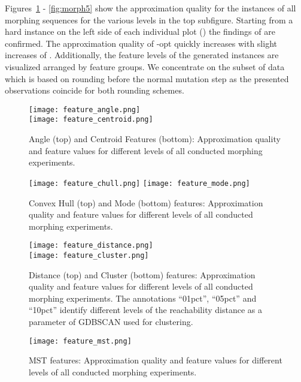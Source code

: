 \documentclass{article}
\begin{document}
Figures~\ref{fig:morph1} - \ref{fig:morph5} show the approximation
quality for the instances of all morphing sequences for the various
 levels in the top subfigure. Starting from a hard instance on
the left side of each individual plot () the findings of
\cite{EnglertRV07} are confirmed. The approximation quality of -opt
quickly increases with slight increases of . Additionally, the
feature levels of the generated instances are visualized arranged by
feature groups. We concentrate on the subset of data which is based on
rounding before the normal mutation step as the presented observations
coincide for both rounding schemes.

\begin{figure}
  \centering
  \texttt{[image: feature\_angle.png]} \\\vspace*{0.3cm}
  \texttt{[image: feature\_centroid.png]}
  \caption{Angle (top) and Centroid Features (bottom): Approximation
    quality and feature values for different  levels of all
    conducted morphing experiments.}
  \label{fig:morph1}
\end{figure}

\begin{figure}
  \centering
  \texttt{[image: feature\_chull.png]}\vspace*{0.3cm}
  \texttt{[image: feature\_mode.png]}
  \caption{Convex Hull (top) and Mode (bottom) features: Approximation quality and feature values for different
     levels of all conducted morphing experiments. }
  \label{fig:morph2}
\end{figure}

\begin{figure}
  \centering
  \texttt{[image: feature\_distance.png]}\\ \vspace*{0.3cm}
  \texttt{[image: feature\_cluster.png]}
  \caption{Distance (top) and Cluster (bottom) features: Approximation
    quality and feature values for different  levels of all
    conducted morphing experiments. The annotations ``01pct'',
    ``05pct'' and ``10pct'' identify different levels of the
    reachability distance as a parameter of GDBSCAN \cite{Sander98}
    used for clustering.}
  \label{fig:morph3}
\end{figure}

\begin{figure}
  \centering
  \texttt{[image: feature\_mst.png]}
  \caption{MST features: Approximation quality and feature values for
    different  levels of all conducted morphing experiments.}
  \label{fig:morph4}
\end{figure}
\end{document}

